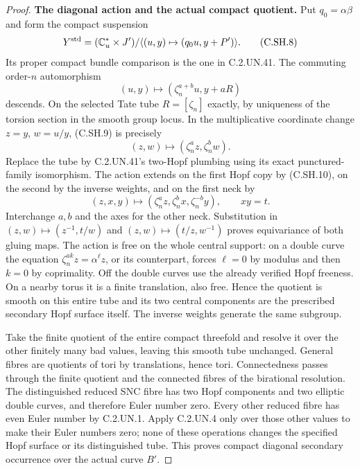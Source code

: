 \begin{proof}
\par\medskip\noindent\textbf{The diagonal action and the actual compact quotient.}
Put $q_0=\alpha\beta$ and form the compact suspension
\[
 Y^{\rm std}=(\mathbb C^*_u\times J')/
       \langle(u,y)\mapsto(q_0u,y+P')\rangle.
\tag{C.SH.8}
\]
Its proper compact bundle comparison is the one in
C.2.UN.41. The commuting order-$n$ automorphism
\[
               (u,y)\longmapsto
                  (\zeta_n^{a+b}u,y+aR)
\tag{C.SH.9}
\]
descends. On the selected Tate tube $R=[\zeta_n]$ exactly,
by uniqueness of the torsion section in the smooth group
locus. In the multiplicative coordinate change $z=y$, $w=u/y$,
(C.SH.9) is precisely
\[
                    (z,w)\longmapsto
                    (\zeta_n^a z,\zeta_n^b w).
\tag{C.SH.10}
\]
Replace the tube by C.2.UN.41's two-Hopf plumbing using
its exact punctured-family isomorphism. The action extends
on the first Hopf copy by (C.SH.10), on the second by the
inverse weights, and on the first neck by
\[
 (z,x,y)\longmapsto
     (\zeta_n^a z,\zeta_n^b x,\zeta_n^{-b}y),
                         \qquad xy=t.
\tag{C.SH.11}
\]
Interchange $a,b$ and the axes for the other neck.
Substitution in $(z,w)\mapsto(z^{-1},t/w)$ and
$(z,w)\mapsto(t/z,w^{-1})$ proves equivariance of both
gluing maps. The action is free on the whole central
support: on a double curve the equation
$\zeta_n^{ak}z=\alpha^\ell z$, or its counterpart, forces
$\ell=0$ by modulus and then $k=0$ by coprimality.
Off the double curves use the already verified Hopf
freeness. On a nearby torus it is a finite translation,
also free. Hence the quotient is smooth on this entire
tube and its two central components are the prescribed
secondary Hopf surface itself. The inverse weights
generate the same subgroup.

Take the finite quotient of the entire compact threefold
and resolve it over the other finitely many bad values,
leaving this smooth tube unchanged. General fibres are
quotients of tori by translations, hence tori. Connectedness
passes through the finite quotient and the connected fibres
of the birational resolution. The distinguished reduced
SNC fibre has two Hopf components and two elliptic double
curves, and therefore Euler number zero. Every other
reduced fibre has even Euler number by C.2.UN.1.
Apply C.2.UN.4 only over those other values to make their
Euler numbers zero; none of these operations changes
the specified Hopf surface or its distinguished tube.
This proves compact diagonal secondary occurrence over
the actual curve $B'$.


\end{proof}
